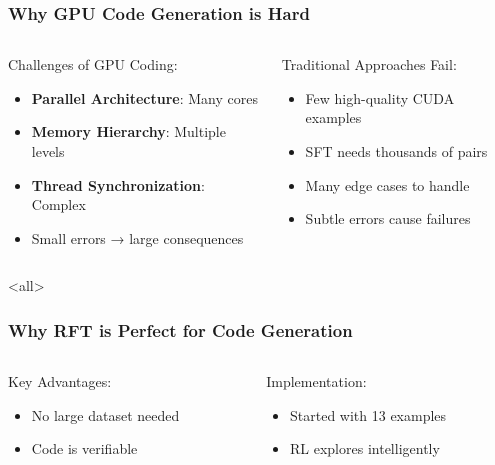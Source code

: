 \documentclass[aspectratio=169]{beamer}
\begin{document}
\begin{frame}[shrink=10]
	\frametitle{Why GPU Code Generation is Hard}
	\begin{columns}[T]
		\begin{column}{0.48\textwidth}
			\begin{block}{Challenges of GPU Coding:}
				\begin{itemize}\setlength{\itemsep}{0em}
					\item \textbf{Parallel Architecture}: Many cores
					\item \textbf{Memory Hierarchy}: Multiple levels
					\item \textbf{Thread Synchronization}: Complex
					\item Small errors → large consequences
				\end{itemize}
			\end{block}
		\end{column}
		\begin{column}{0.48\textwidth}
			\begin{block}{Traditional Approaches Fail:}
				\begin{itemize}\setlength{\itemsep}{0em}
					\item Few high-quality CUDA examples
					\item SFT needs thousands of pairs
					\item Many edge cases to handle
					\item Subtle errors cause failures
				\end{itemize}
			\end{block}
		\end{column}
	\end{columns}
\end{frame}

\mode<all>{\vspace{-0.5cm}}

\begin{frame}[t]
	\frametitle{Why RFT is Perfect for Code Generation}
	\begin{columns}[T]
		\begin{column}{0.48\textwidth}
			\begin{block}{Key Advantages:}
				\begin{itemize}
					\item No large dataset needed
					\item Code is verifiable
				\end{itemize}
			\end{block}
		\end{column}
		\begin{column}{0.48\textwidth}
			\begin{block}{Implementation:}
				\begin{itemize}
					\item Started with 13 examples
					\item RL explores intelligently
				\end{itemize}
			\end{block}
		\end{column}
	\end{columns}
\end{frame}
\end{document}
